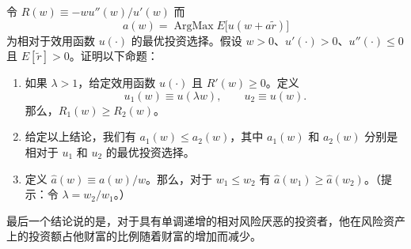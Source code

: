 
\begin{problem}
 令 $R(w)\equiv -wu''(w)/u'(w)$ 而
\[
    a(w)=\operatorname{ArgMax}E\bigl[u(w+a\tilde{r})\bigr]
\]
为相对于效用函数 $u(\cdot)$ 的最优投资选择。假设 $w>0$、$u'(\cdot)>0$、$u''(\cdot)\le 0$ 且 $E[\tilde{r}]>0$。证明以下命题：
\begin{enumerate}[label=(\alph*)]
    \item 如果 $\lambda>1$，给定效用函数 $u(\cdot)$ 且 $R'(w)\ge 0$。定义
    \[
        u_{1}(w)\equiv u(\lambda w),\qquad u_{2}\equiv u(w).
    \]
    那么，$R_{1}(w)\ge R_{2}(w)$。
    \item 给定以上结论，我们有 $a_{1}(w)\le a_{2}(w)$，其中 $a_{1}(w)$ 和 $a_{2}(w)$ 分别是相对于 $u_{1}$ 和 $u_{2}$ 的最优投资选择。
    \item 定义 $\widehat{a}(w)\equiv a(w)/w$。那么，对于 $w_{1}\le w_{2}$ 有 $\widehat{a}(w_{1})\ge\widehat{a}(w_{2})$。（提示：令 $\lambda=w_{2}/w_{1}$。）
\end{enumerate}
最后一个结论说的是，对于具有单调递增的相对风险厌恶的投资者，他在风险资产上的投资额占他财富的比例随着财富的增加而减少。
\end{problem}
